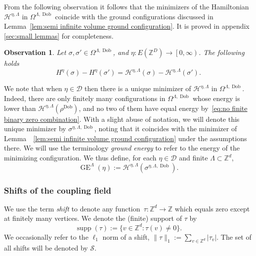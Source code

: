 \documentclass[11pt, reqno]{amsart}
\newtheorem{obs}[theorem]{Observation}
\newcommand{\Z}{\mathbb{Z}}
\DeclareMathOperator{\supp}{supp}
\DeclareMathOperator{\Dob}{Dob}
\DeclareMathOperator{\GE}{GE}
\numberwithin{equation}{section}
\begin{document}
From the following observation it follows that the minimizers of the Hamiltonian $\mathcal{H}^{\eta,\Lambda}$ in $\Omega^{\Lambda,\Dob}$ coincide with the ground configurations discussed in Lemma~\ref{lem:semi infinite volume ground configuration}. It is proved in appendix \ref{sec:small lemmas} for completeness.
 
\begin{obs}\label{obs:different Hamiltonians equivalent}
Let $\sigma, \sigma' \in \Omega^{\Lambda,\Dob}$, and $\eta:E(\Z^{D}) \rightarrow \left[0,\infty\right) $. The following holds \begin{equation*}
H^{\eta}(\sigma)- 
H^{\eta}(\sigma') =
\mathcal{H}^{\eta,\Lambda}(\sigma)- 
\mathcal{H}^{\eta, \Lambda}(\sigma').
\end{equation*}
\end{obs}

We note that when $\eta\in\mathcal{D}$ then there is a unique minimizer of $\mathcal{H}^{\eta,\Lambda}$ in $\Omega^{\Lambda,\Dob}$. Indeed, there are only finitely many configurations in $\Omega^{\Lambda,\Dob}$ whose energy is lower than $\mathcal{H}^{\eta,\Lambda}(\rho^{\Dob})$, and no two of them have equal energy by~\eqref{eq:no finite binary zero combination}. With a slight abuse of notation, we will denote this unique minimizer by $\sigma^{\eta,\Lambda,\Dob}$, noting that it coincides with the minimizer of Lemma~~\ref{lem:semi infinite volume ground configuration} under the assumptions there. We will use the terminology \emph{ground energy} to refer to the energy of the minimizing configuration. We thus define, for each $\eta\in\mathcal{D}$ and finite $\Lambda\subset\Z^d$,
\begin{equation}\label{eq:ground energy def}
\GE^{\Lambda}(\eta):=\mathcal{H}^{\eta,\Lambda}(\sigma^{\eta,\Lambda,\Dob}).
\end{equation}

\subsubsection{Shifts of the coupling field}
\label{sec:shifts of the disorder}
\mbox{}

\smallskip

We use the term \emph{shift} to denote any function~$\tau\colon \Z^d\to\Z$ which equals zero except at finitely many vertices.
We denote the (finite) support of $\tau$ by
\begin{equation*}
\supp(\tau):=\{v\in\Z^d\colon \tau(v)\neq 0\}.
\end{equation*}
We occasionally refer to the $\ell_1$ norm of a shift, $\|\tau\|_1:=\sum_{v\in\Z^d}|\tau_v|$.
The set of all shifts will be denoted by $\mathcal S$.
\end{document}
